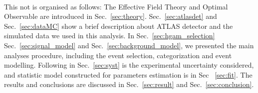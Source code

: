\paragraph{}This not is organised as follows: The Effective Field Theory and Optimal Observable are introduced in Sec.~\ref{sec:theory}. Sec.~\ref{sec:atlasdet} and Sec.~\ref{sec:dataMC} show a brief description about ATLAS detector and the simulated data we used in this analysis. In Sec.~\ref{sec:hgam_selection} Sec.~\ref{sec:signal_model} and Sec.~\ref{sec:background_model}, we presented the main analyses procedure, including the event selection, categorization and event modelling. Following in Sec.~\ref{sec:syst} is the experimental uncertainty considered, and statistic model constructed for parameters estimation is in Sec ~\ref{sec:fit}. The results and conclusions are discussed in Sec.~\ref{sec:result} and Sec.~\ref{sec:conclusion}.  

